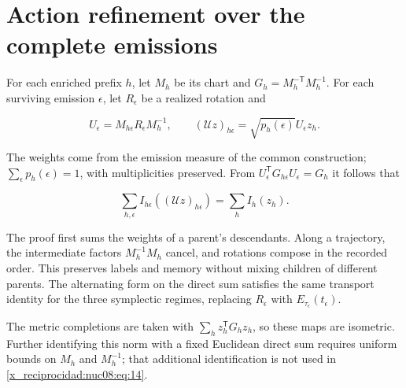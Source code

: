 \section{Action refinement over the complete emissions}

For each enriched prefix \(h\), let \(M_h\) be its chart and \(G_h=M_h^{-\mathsf T}M_h^{-1}\). For each surviving emission \(\epsilon\), let \(R_\epsilon\) be a realized rotation and

\[
U_\epsilon=M_{h\epsilon}R_\epsilon M_h^{-1},\qquad
(\mathscr U z)_{h\epsilon}=\sqrt{p_h(\epsilon)}U_\epsilon z_h.
\]

The weights come from the emission measure of the common construction; \(\sum_\epsilon p_h(\epsilon)=1\), with multiplicities preserved. From \(U_\epsilon^\mathsf TG_{h\epsilon}U_\epsilon=G_h\) it follows that

\begin{equation}
\sum_{h,\epsilon}I_{h\epsilon}((\mathscr U z)_{h\epsilon})
=\sum_h I_h(z_h).
\label{x_reciprocidad:nuc08:eq:14}
\end{equation}

The proof first sums the weights of a parent's descendants. Along a trajectory, the intermediate factors \(M_h^{-1}M_h\) cancel, and rotations compose in the recorded order. This preserves labels and memory without mixing children of different parents. The alternating form on the direct sum satisfies the same transport identity for the three symplectic regimes, replacing \(R_\epsilon\) with \(E_{\tau_\epsilon}(t_\epsilon)\).

The metric completions are taken with \(\sum_h z_h^\mathsf TG_hz_h\), so these maps are isometric. Further identifying this norm with a fixed Euclidean direct sum requires uniform bounds on \(M_h\) and \(M_h^{-1}\); that additional identification is not used in \eqref{x_reciprocidad:nuc08:eq:14}.
